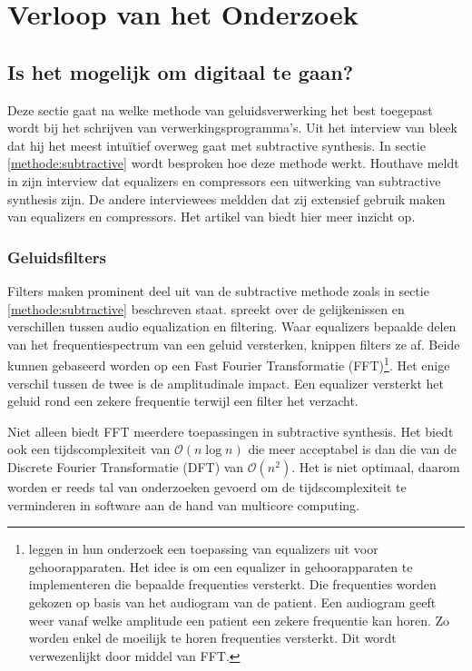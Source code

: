 \chapter{Verloop van het Onderzoek}
\label{onderzoek}

\section{Is het mogelijk om digitaal te gaan?}
\label{onderzoeksvraag1}

Deze sectie gaat na welke methode van geluidsverwerking het best toegepast wordt bij het schrijven van verwerkingsprogramma's. Uit het interview van \textcite{thomashouthave} bleek dat hij het meest intuïtief overweg gaat met subtractive synthesis. In sectie \ref{methode:subtractive} wordt besproken hoe deze methode werkt. Houthave meldt in zijn interview dat equalizers en compressors een uitwerking van subtractive synthesis zijn. \autocite{thomashouthave} De andere interviewees meldden dat zij extensief gebruik maken van equalizers en compressors. Het artikel van \textcite{filtervseq} biedt hier meer inzicht op.

\subsection{Geluidsfilters}

Filters maken prominent deel uit van de subtractive methode zoals in sectie \ref{methode:subtractive} beschreven staat. \textcite{filtervseq} spreekt over de gelijkenissen en verschillen tussen audio equalization en filtering. Waar equalizers bepaalde delen van het frequentiespectrum van een geluid versterken, knippen filters ze af. Beide kunnen gebaseerd worden op een Fast Fourier Transformatie (FFT)\footnote{\textcite{fouriereq} leggen in hun onderzoek een toepassing van equalizers uit voor gehoorapparaten. Het idee is om een equalizer in gehoorapparaten te implementeren die bepaalde frequenties versterkt. Die frequenties worden gekozen op basis van het audiogram van de patient. Een audiogram geeft weer vanaf welke amplitude een patient een zekere frequentie kan horen. Zo worden enkel de moeilijk te horen frequenties versterkt. Dit wordt verwezenlijkt door middel van FFT.}. Het enige verschil tussen de twee is de amplitudinale impact. Een equalizer versterkt het geluid rond een zekere frequentie terwijl een filter het verzacht.

Niet alleen biedt FFT meerdere toepassingen in subtractive synthesis. Het biedt ook een tijdscomplexiteit van $\mathcal{O}(n\log{}n)$ die meer acceptabel is dan die van de Discrete Fourier Transformatie (DFT) van $\mathcal{O}(n^2)$.\autocite{ffttime} Het is niet optimaal, daarom worden er reeds tal van onderzoeken gevoerd om de tijdscomplexiteit te verminderen in software aan de hand van multicore computing. \autocite{robbievincke}

